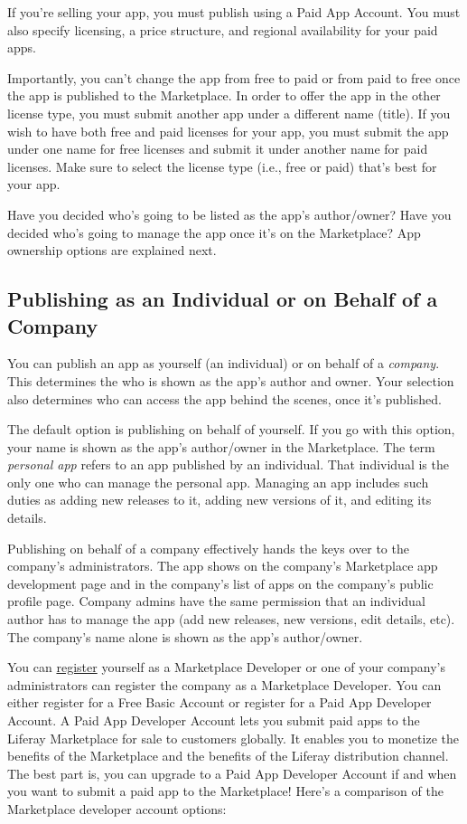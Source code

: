 If you're selling your app, you must publish using a Paid App Account.
You must also specify licensing, a price structure, and regional
availability for your paid apps.

Importantly, you can't change the app from free to paid or from paid to
free once the app is published to the Marketplace. In order to offer the
app in the other license type, you must submit another app under a
different name (title). If you wish to have both free and paid licenses
for your app, you must submit the app under one name for free licenses
and submit it under another name for paid licenses. Make sure to select
the license type (i.e., free or paid) that's best for your app.

Have you decided who's going to be listed as the app's author/owner?
Have you decided who's going to manage the app once it's on the
Marketplace? App ownership options are explained next.

\subsection{Publishing as an Individual or on Behalf of a
Company}\label{publishing-as-an-individual-or-on-behalf-of-a-company}

You can publish an app as yourself (an individual) or on behalf of a
\emph{company}. This determines the who is shown as the app's author and
owner. Your selection also determines who can access the app behind the
scenes, once it's published.

The default option is publishing on behalf of yourself. If you go with
this option, your name is shown as the app's author/owner in the
Marketplace. The term \emph{personal app} refers to an app published by
an individual. That individual is the only one who can manage the
personal app. Managing an app includes such duties as adding new
releases to it, adding new versions of it, and editing its details.

Publishing on behalf of a company effectively hands the keys over to the
company's administrators. The app shows on the company's Marketplace app
development page and in the company's list of apps on the company's
public profile page. Company admins have the same permission that an
individual author has to manage the app (add new releases, new versions,
edit details, etc). The company's name alone is shown as the app's
author/owner.

You can
\href{https://www.liferay.com/marketplace/become-a-developer}{register}
yourself as a Marketplace Developer or one of your company's
administrators can register the company as a Marketplace Developer. You
can either register for a Free Basic Account or register for a Paid App
Developer Account. A Paid App Developer Account lets you submit paid
apps to the Liferay Marketplace for sale to customers globally. It
enables you to monetize the benefits of the Marketplace and the benefits
of the Liferay distribution channel. The best part is, you can upgrade
to a Paid App Developer Account if and when you want to submit a paid
app to the Marketplace! Here's a comparison of the Marketplace developer
account options:

